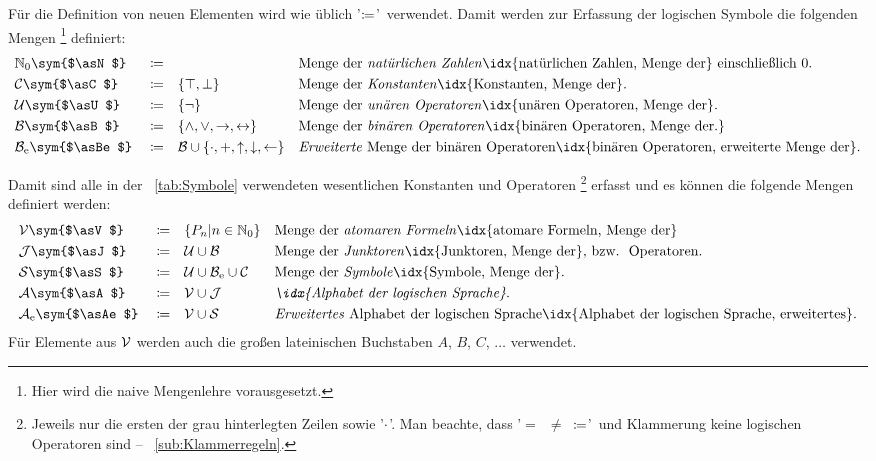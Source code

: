 \documentclass[english,ngerman,parskip=half,headsepline,footsepline]{scrreprt}
\makeatletter
\newcommand*{\Sdx}[1]{#1\sym{$#1$}}%
\newcommand*{\textbzw}{bzw.\@ }
\newcommand*{\clq}{'}%
\newcommand*{\crq}{'}%
\newcommand*{\cse}{, }%
\newcommand*{\csp}{\crqt\cset\clqt}%
\newcommand*{\clqt}{}%
\newcommand*{\crqt}{}%
\newcommand*{\cset}{~}%
\makeatother
\begin{document}
	Für die Definition von neuen Elementen wird wie üblich \clq$\coloneqq$\crq\ verwendet.
	Damit werden zur Erfassung der logischen Symbole die folgenden Mengen%
	\footnote{Hier wird die naive Mengenlehre vorausgesetzt.}
	definiert:
	\begin{align}
		&\Sdx{\asN}&&\defeq&& &&\textrm{Menge der \emph{natürlichen Zahlen}\idx{natürlichen Zahlen, Menge der} einschließlich 0.}\\
		&\Sdx{\asC}&&\defeq&&\{\ltrue,\lfalse\}&&\textrm{Menge der \emph{Konstanten}\idx{Konstanten, Menge der}.}\\
		&\Sdx{\asU}&&\defeq&&\{\lnot\}&&\textrm{Menge der \emph{unären Operatoren}\idx{unären Operatoren, Menge der}.}\\
		&\Sdx{\asB}&&\defeq&&\{\land,\lor,\limp,\lequiv\}&&\textrm{Menge der \emph{binären Operatoren}\idx{binären Operatoren, Menge der.}}\\
		&\Sdx{\asBe}&&\defeq&&\asB\cup\{\mult,\add,\lnand,\lnor,\lleftimp\}&&\textrm{\emph{Erweiterte} Menge der binären Operatoren\idx{binären Operatoren, erweiterte Menge der}.}
	\end{align}

	Damit sind alle in der \tablename~\vref{tab:Symbole} verwendeten wesentlichen Konstanten und Operatoren%
	\footnote{%
		Jeweils nur die ersten der grau hinterlegten Zeilen sowie \clq$\cdot$\crq.
		Man beachte, dass \clq$=$\csp$\ne$\csp$\coloneqq$\crq\ und Klammerung keine logischen Operatoren sind -- \seename~\vref{sub:Klammerregeln}.
	}
	erfasst und es können die folgende Mengen definiert werden:
	\begin{align}
		&\Sdx{\asV}&&\defeq&&\{P_n|n\in\mathbb{N}_0\}&&\textrm{Menge der \emph{atomaren Formeln}\idx{atomare Formeln, Menge der}}\\
		&\Sdx{\asJ}&&\defeq&&\asU\cup\asB&&\textrm{Menge der \emph{Junktoren}\idx{Junktoren, Menge der}, \textbzw\ Operatoren.}\\
		&\Sdx{\asS}&&\defeq&&\asU\cup\asBe\cup\asC&&\textrm{Menge der \emph{Symbole}\idx{Symbole, Menge der}.}\\
		&\Sdx{\asA}&&\defeq&&\asV\cup\asJ&&\textrm{\emph{\idx{Alphabet der logischen Sprache}}.}\\
		&\Sdx{\asAe}&&\defeq&&\asV\cup\asS&&\textrm{\emph{Erweitertes} Alphabet der logischen Sprache\idx{Alphabet der logischen Sprache, erweitertes}.}
	\end{align}
	Für Elemente aus $\mathcal{V}$ werden auch die großen lateinischen Buchstaben $A$, $B$, $C$, $\dots$ verwendet.
\end{document}

